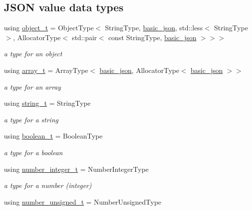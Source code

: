 \subsection*{J\-S\-O\-N value data types}
\begin{DoxyCompactItemize}
\item 
using \hyperlink{classnlohmann_1_1basic__json_a0ac9894c9de8dc551cf2e5f1c605537f}{object\-\_\-t} = Object\-Type$<$ String\-Type, \hyperlink{classnlohmann_1_1basic__json}{basic\-\_\-json}, std\-::less$<$ String\-Type $>$, Allocator\-Type$<$ std\-::pair$<$ const String\-Type, \hyperlink{classnlohmann_1_1basic__json}{basic\-\_\-json} $>$$>$$>$
\begin{DoxyCompactList}\small\item\em a type for an object \end{DoxyCompactList}\item 
using \hyperlink{classnlohmann_1_1basic__json_ab00b882d39306d663c23dab110f5cae0}{array\-\_\-t} = Array\-Type$<$ \hyperlink{classnlohmann_1_1basic__json}{basic\-\_\-json}, Allocator\-Type$<$ \hyperlink{classnlohmann_1_1basic__json}{basic\-\_\-json} $>$$>$
\begin{DoxyCompactList}\small\item\em a type for an array \end{DoxyCompactList}\item 
using \hyperlink{classnlohmann_1_1basic__json_ab63e618bbb0371042b1bec17f5891f42}{string\-\_\-t} = String\-Type
\begin{DoxyCompactList}\small\item\em a type for a string \end{DoxyCompactList}\item 
using \hyperlink{classnlohmann_1_1basic__json_af3bc3e83aa162d7ba4df16a949872723}{boolean\-\_\-t} = Boolean\-Type
\begin{DoxyCompactList}\small\item\em a type for a boolean \end{DoxyCompactList}\item 
using \hyperlink{classnlohmann_1_1basic__json_ac4b10b2364f26ce47bdb9a413ff04a59}{number\-\_\-integer\-\_\-t} = Number\-Integer\-Type
\begin{DoxyCompactList}\small\item\em a type for a number (integer) \end{DoxyCompactList}\item 
using \hyperlink{classnlohmann_1_1basic__json_a60a04166c122072ab11eaf9845d9cd1d}{number\-\_\-unsigned\-\_\-t} = Number\-Unsigned\-Type
$$
\end{DoxyCompactItemize}
